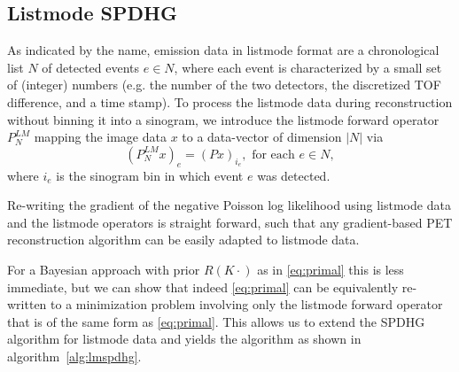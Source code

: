 \subsection*{Listmode SPDHG}

As indicated by the name, emission data in listmode format are a chronological list $N$ of detected 
events $e \in N$, where each event is characterized by a small set of (integer) numbers 
(e.g. the number of the two detectors, the discretized TOF difference, and a time stamp).
To process the listmode data during reconstruction without binning it into a sinogram,
we introduce the listmode forward operator $P^{LM}_N$ mapping the image data $x$ to a 
data-vector of dimension $|N|$ via \[ (P^{LM}_N x)_e  = (Px)_{i_e} , \text{ for each }e \in N,\]
where $i_e$ is the sinogram bin in which event $e$ was detected.

Re-writing the gradient of the negative Poisson log likelihood using listmode data and the
listmode operators is straight forward, such that any gradient-based
PET reconstruction algorithm can be easily adapted to listmode data.

For a Bayesian approach with prior $R(K \cdot)$ as in \eqref{eq:primal} this is less immediate, but we can
show that indeed \eqref{eq:primal} can be equivalently re-written to a minimization problem involving only the listmode forward operator that is of the same form as \eqref{eq:primal}. This allows us to extend the SPDHG algorithm for listmode data and yields the algorithm as shown in algorithm~\ref{alg:lmspdhg}.



